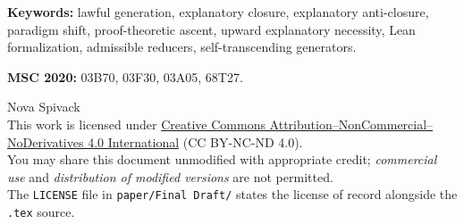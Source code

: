 \documentclass[11pt,a4paper]{article}
\theoremstyle{definition}
\begin{document}
\begin{abstract}
\smallskip
\noindent
Philosophically, this yields a third option between naïve reductionism and anti-naturalist mystification: lawful self-transcending structure. Everything in the tower remains generated from below under fixed law, yet explanation need not close from below. The paper does not claim a universal diagonal over all raw interfaces, a universal paradigm tower for every regime family, backward causation, or that every deterministic system exhibits the phenomenon. It claims, instead, the existence, structure, and transferred stability of lawful self-transcending generators under the exact hypotheses stated in the cited formal results (Sections~\ref{sec:proved-overview} and \ref{sec:boundaries}; Tables~\ref{tab:crown-lean}--\ref{tab:theorem-inventory}).

\smallskip
\noindent
\textbf{Formal proof in Lean~4.} The claims anchored in \texttt{NoveltyTheory/} are machine-checked theorems, not prose: the project library currently contains \textbf{422} \texttt{theorem}/\texttt{lemma} declarations by the same automated line parse used in the repository audit (scope: \texttt{NoveltyTheory/} sources, not Mathlib), with \textbf{zero} \texttt{sorry} and \textbf{no} \texttt{axiom} declarations in those sources.

\end{abstract}

\noindent\textbf{Keywords:} lawful generation, explanatory closure, explanatory anti-closure, paradigm shift, proof-theoretic ascent, upward explanatory necessity, Lean formalization, admissible reducers, self-transcending generators.

\noindent\textbf{MSC 2020:} 03B70, 03F30, 03A05, 68T27.

\medskip
\begin{center}
\small
\textcopyright{} Nova Spivack\\
This work is licensed under \href{https://creativecommons.org/licenses/by-nc-nd/4.0/}{Creative Commons Attribution--NonCommercial--NoDerivatives 4.0 International} (CC BY-NC-ND 4.0).\\
You may share this document unmodified with appropriate credit; \emph{commercial use} and \emph{distribution of modified versions} are not permitted.\\
The \texttt{LICENSE} file in \texttt{paper/Final Draft/} states the license of record alongside the \texttt{.tex} source.
\end{center}
\medskip

\tableofcontents
\end{document}
